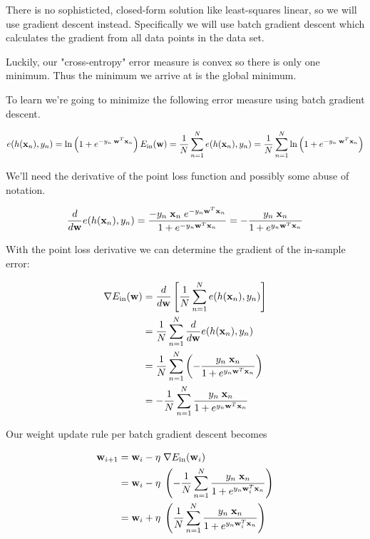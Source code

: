 \documentclass[11pt]{article}
\begin{document}
There is no sophisticted, closed-form solution like least-squares
linear, so we will use gradient descent instead. Specifically we will
use batch gradient descent which calculates the gradient from all data
points in the data set.

Luckily, our "cross-entropy" error measure is convex so there is only
one minimum. Thus the minimum we arrive at is the global minimum.

    To learn we're going to minimize the following error measure using batch
gradient descent.

\[
e(h({\bf x}_n), y_n) = \ln \left( 1+e^{-y_n \; {\bf w}^T {\bf x}_n} \right) \\
E_\text{in}({\bf w}) = \frac{1}{N} \sum_{n=1}^{N} e(h({\bf x}_n), y_n) = \frac{1}{N} \sum_{n=1}^{N} \ln \left( 1+e^{-y_n \; {\bf w}^T {\bf x}_n} \right)
\]

We'll need the derivative of the point loss function and possibly some
abuse of notation.

\[
\frac{d}{d{\bf w}} e(h({\bf x}_n), y_n)
= \frac{-y_n \; {\bf x}_n \; e^{-y_n {\bf w}^T {\bf x}_n}}{1 + e^{-y_n {\bf w}^T {\bf x}_n}}
= -\frac{y_n \; {\bf x}_n}{1 + e^{y_n {\bf w}^T {\bf x}_n}}
\]

    With the point loss derivative we can determine the gradient of the
in-sample error:

\[
\begin{align}
\nabla E_\text{in}({\bf w})
&= \frac{d}{d{\bf w}} \left[ \frac{1}{N} \sum_{n=1}^N e(h({\bf x}_n), y_n) \right] \\
&= \frac{1}{N} \sum_{n=1}^N \frac{d}{d{\bf w}} e(h({\bf x}_n), y_n) \\
&= \frac{1}{N} \sum_{n=1}^N \left( - \frac{y_n \; {\bf x}_n}{1 + e^{y_n {\bf w}^T {\bf x}_n}} \right) \\
&= - \frac{1}{N} \sum_{n=1}^N \frac{y_n \; {\bf x}_n}{1 + e^{y_n {\bf w}^T {\bf x}_n}} \\
\end{align}
\]

Our weight update rule per batch gradient descent becomes

\[
\begin{align}
{\bf w}_{i+1} &= {\bf w}_i - \eta \; \nabla E_\text{in}({\bf w}_i) \\
&= {\bf w}_i - \eta \; \left( - \frac{1}{N} \sum_{n=1}^N \frac{y_n \; {\bf x}_n}{1 + e^{y_n {\bf w}_i^T {\bf x}_n}} \right) \\
&= {\bf w}_i + \eta \; \left( \frac{1}{N} \sum_{n=1}^N \frac{y_n \; {\bf x}_n}{1 + e^{y_n {\bf w}_i^T {\bf x}_n}} \right) \\
\end{align}
\]
\end{document}
